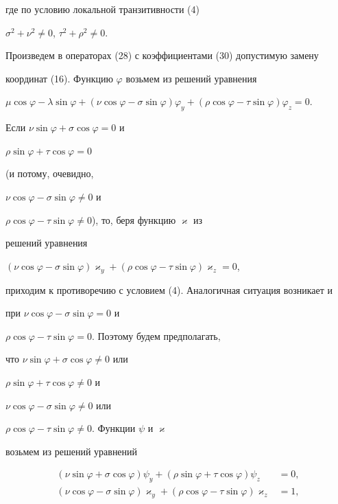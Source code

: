 где по условию локальной транзитивности (4) 


$\sigma^2+\nu^2\ne 0$, $\tau^2+\rho^2\ne 0$. 


 


Произведем в операторах (28) с коэффициентами (30) допустимую замену 


координат (16). Функцию $\varphi$ возьмем из решений уравнения 


$\mu\cos\varphi-\lambda\sin\varphi+(\nu\cos\varphi-\sigma\sin\varphi) 


\varphi_y+(\rho\cos\varphi-\tau\sin\varphi)\varphi_z=0$. 


Если $\nu\sin\varphi+\sigma\cos\varphi=0$ и 


$\rho\sin\varphi+\tau\cos\varphi=0$ 


(и потому, очевидно, 


$\nu\cos\varphi-\sigma\sin\varphi\ne 0$ и 


$\rho\cos\varphi-\tau\sin\varphi\ne 0$), то, беря функцию $\varkappa$ из 


решений уравнения 


$(\nu\cos\varphi-\sigma\sin\varphi)\varkappa_y+ 


(\rho\cos\varphi-\tau\sin\varphi)\varkappa_z=0$, 


приходим к противоречию с условием (4). Аналогичная ситуация возникает и 


при $\nu\cos\varphi-\sigma\sin\varphi=0$ и 


$\rho\cos\varphi-\tau\sin\varphi=0$. Поэтому будем предполагать, 


что $\nu\sin\varphi+\sigma\cos\varphi\ne 0$ или 


$\rho\sin\varphi+\tau\cos\varphi\ne 0$ и 


$\nu\cos\varphi-\sigma\sin\varphi\ne 0$ или 


$\rho\cos\varphi-\tau\sin\varphi\ne 0$. Функции $\psi$ и $\varkappa$ 


возьмем из решений уравнений 


\begin{align*} 


(\nu\sin\varphi+\sigma\cos\varphi)\psi_y+ 


(\rho\sin\varphi+\tau\cos\varphi)\psi_z&=0,\\ 


(\nu\cos\varphi-\sigma\sin\varphi)\varkappa_y+ 


(\rho\cos\varphi-\tau\sin\varphi)\varkappa_z&=1, 


\end{align*} 


